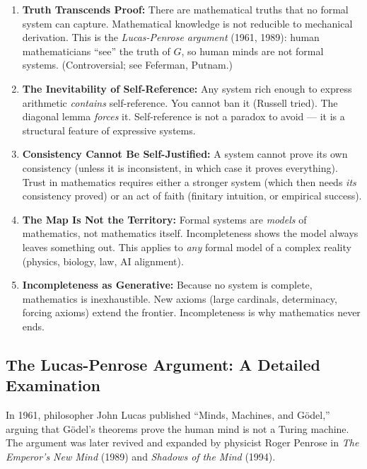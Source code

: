 \begin{enumerate}
\item \textbf{Truth Transcends Proof:} There are mathematical truths that no formal system can capture. Mathematical knowledge is not reducible to mechanical derivation. This is the \emph{Lucas-Penrose argument} (1961, 1989): human mathematicians ``see'' the truth of $G$, so human minds are not formal systems. (Controversial; see Feferman, Putnam.)

\item \textbf{The Inevitability of Self-Reference:} Any system rich enough to express arithmetic \emph{contains} self-reference. You cannot ban it (Russell tried). The diagonal lemma \emph{forces} it. Self-reference is not a paradox to avoid --- it is a structural feature of expressive systems.

\item \textbf{Consistency Cannot Be Self-Justified:} A system cannot prove its own consistency (unless it is inconsistent, in which case it proves everything). Trust in mathematics requires either a stronger system (which then needs \emph{its} consistency proved) or an act of faith (finitary intuition, or empirical success).

\item \textbf{The Map Is Not the Territory:} Formal systems are \emph{models} of mathematics, not mathematics itself. Incompleteness shows the model always leaves something out. This applies to \emph{any} formal model of a complex reality (physics, biology, law, AI alignment).

\item \textbf{Incompleteness as Generative:} Because no system is complete, mathematics is inexhaustible. New axioms (large cardinals, determinacy, forcing axioms) extend the frontier. Incompleteness is why mathematics never ends.
\end{enumerate}

\subsection{The Lucas-Penrose Argument: A Detailed Examination}
\label{sec:godel:lucas_penrose}

In 1961, philosopher John Lucas published ``Minds, Machines, and Gödel,'' arguing that Gödel's theorems prove the human mind is not a Turing machine. The argument was later revived and expanded by physicist Roger Penrose in \emph{The Emperor's New Mind} (1989) and \emph{Shadows of the Mind} (1994).

